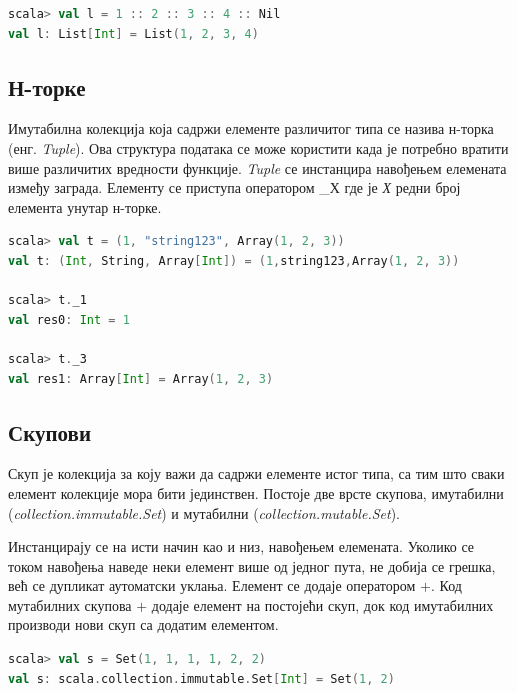 \documentclass[12pt,oneside]{memoir}
\begin{document}
\begin{lstlisting}[language=Scala, caption={Додавање елемената на празну листу}, label={lst:scala_coll_lists_head_op_nill}]
scala> val l = 1 :: 2 :: 3 :: 4 :: Nil
val l: List[Int] = List(1, 2, 3, 4)
\end{lstlisting}

\subsection{Н-торке}
\label{subsec:scala_tuple}

Имутабилна колекција која садржи елементе различитог типа се назива н-торка (енг. \textit{Tuple}). Ова структура података се може користити када је потребно вратити више различитих вредности функције. \textit{Tuple} се инстанцира навођењем елемената између заграда. Елементу се приступа оператором \_Х где је \textit{Х} редни број елемента унутар н-торке. \cite{scala_prog}

\begin{lstlisting}[language=Scala, caption={Н-торка у Скали}, label={lst:scala_coll_tuple_example}]
scala> val t = (1, "string123", Array(1, 2, 3))
val t: (Int, String, Array[Int]) = (1,string123,Array(1, 2, 3))

scala> t._1
val res0: Int = 1

scala> t._3
val res1: Array[Int] = Array(1, 2, 3)
\end{lstlisting}

\subsection{Скупови}
\label{subsec:scala_sets}

Скуп је колекција за коју важи да садржи елементе истог типа, са тим што сваки елемент колекције мора бити јединствен. Постоје две врсте скупова, имутабилни (\textit{collection.immutable.Set}) и мутабилни (\textit{collection.mutable.Set}).

Инстанцирају се на исти начин као и низ, навођењем елемената. Уколико се током навођења наведе неки елемент више од једног пута, не добија се грешка, већ се дупликат аутоматски уклања. Елемент се додаје оператором $+$. Код мутабилних скупова $+$ додаје елемент на постојећи скуп, док код имутабилних производи нови скуп са додатим елементом. \cite{scala_prog}

\begin{lstlisting}[language=Scala, caption={Инстанцирање скупа у Скали}, label={lst:scala_coll_set_example}]
scala> val s = Set(1, 1, 1, 1, 2, 2)
val s: scala.collection.immutable.Set[Int] = Set(1, 2)
\end{lstlisting}
\end{document}
